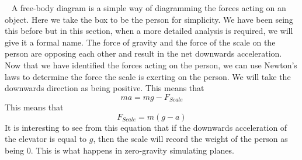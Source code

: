 \
\newline
A free-body diagram is a simple way of diagramming the forces acting on an object. Here we take the box to be the person for simplicity. We have been seing this before but in this section, when a more detailed analysis is required, we will give it a formal name. The force of gravity and the force of the scale on the person are opposing each other and result in the net downwards acceleration. Now that we have identified the forces acting on the person, we can use Newton's laws to determine the force the scale is exerting on the person. We will take the downwards direction as being positive. This means that \begin{equation}ma=mg-F_{Scale}\end{equation} This means that \begin{equation}F_{Scale}=m\left(g-a\right)\end{equation} It is interesting to see from this equation that if the downwards acceleration of the elevator is equal to $g$, then the scale will record the weight of the person as being 0. This is what happens in zero-gravity simulating planes. 